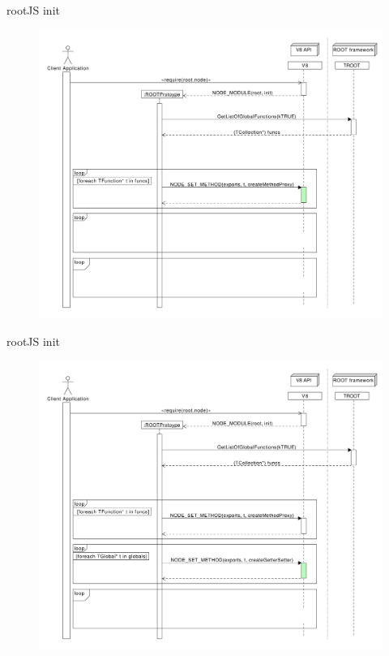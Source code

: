 \begin{frame}{rootJS init}
  \begin{figure}[htb]
    \centering
      \includegraphics[width=\textwidth, height=.85\textheight, keepaspectratio]{./resources/initialize/initialize_h4.pdf}
  \end{figure}
\end{frame}

\begin{frame}{rootJS init}
  \begin{figure}[htb]
    \centering
      \includegraphics[width=\textwidth, height=.85\textheight, keepaspectratio]{./resources/initialize/initialize_h5.pdf}
  \end{figure}
\end{frame}

